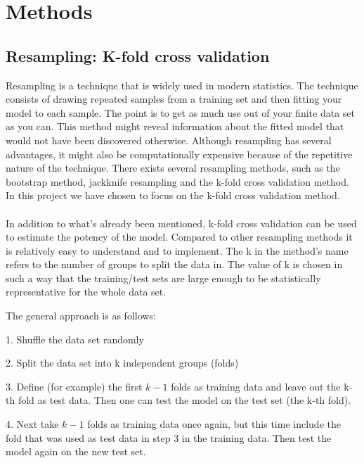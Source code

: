 \documentclass{emulateapj}
\begin{document}
\section{Methods}
\subsection{Resampling: K-fold cross validation }

Resampling is a technique that is widely used in modern statistics. The technique consists of drawing repeated samples from a training set and then fitting your model to each sample. The point is to get as much use out of your finite data set as you can. This method might reveal information about the fitted model that would not have been discovered otherwise.\newline
Although resampling has several advantages, it might also be computationally expensive because of the repetitive nature of the technique.
There exists several resampling methods, such as the bootstrap method, jackknife resampling and the k-fold cross validation method. In this project we have chosen to focus on the k-fold cross validation method.\\\\

In addition to what's already been mentioned, k-fold cross validation can be used to estimate the potency of the model. Compared to other resampling methods it is relatively easy to understand and to implement. The k in the method's name refers to the number of groups to split the data in. The value of k is chosen in such a way that the training/test sets are large enough to be statistically representative for the whole data set.\newline

The general approach is as follows:\newline

1. Shuffle the data set randomly\newline

2. Split the data set into k independent groups (folds)\newline

3. Define (for example) the first $k-1$ folds as training data and leave out the k-th fold as test data. Then one can test the model on the test set (the k-th fold).\newline

4. Next take $k-1$ folds as training data once again, but this time include the fold that was used as test data in step 3 in the training data. Then test the model again on the new test set.\newline
\end{document}
